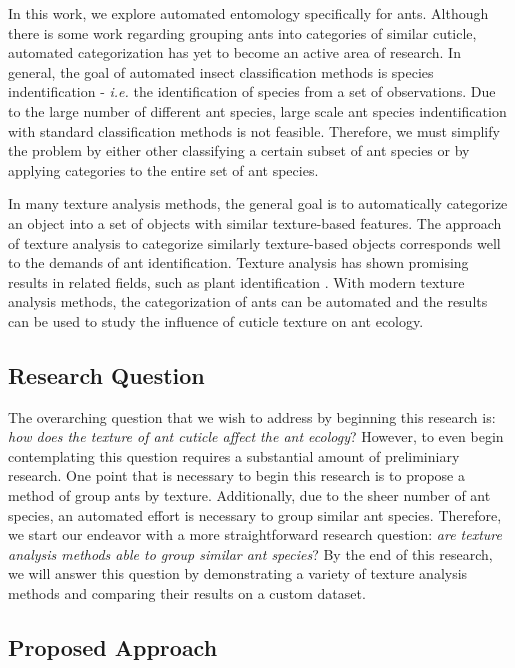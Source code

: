 \documentclass[12pt]{article}
\begin{document}
In this work, we explore automated entomology specifically for ants. Although
there is some work regarding grouping ants into categories of similar cuticle,
automated categorization has yet to become an active area of research. In
general, the goal of automated insect classification methods is species
indentification - \textit{i.e.} the identification of species from a set of
observations. Due to the large number of different ant species, large scale ant
species indentification with standard classification methods is not feasible.
Therefore, we must simplify the problem by either other classifying a certain
subset of ant species or by applying categories to the entire set of ant
species.

In many texture analysis methods, the general goal is to automatically
categorize an object into a set of objects with similar texture-based features.
The approach of texture analysis to categorize similarly texture-based objects
corresponds well to the demands of ant identification. Texture analysis has
shown promising results in related fields, such as plant identification
\cite{boudra_plant_2018}. With modern texture analysis methods, the
categorization of ants can be automated and the results can be used to study the
influence of cuticle texture on ant ecology.

\subsection{Research Question}

The overarching question that we wish to address by beginning this research is:
\textit{how does the texture of ant cuticle affect the ant ecology}? However, to
even begin contemplating this question requires a substantial amount of
preliminiary research. One point that is necessary to begin this research is to
propose a method of group ants by texture. Additionally, due to the sheer number
of ant species, an automated effort is necessary to group similar ant species.
Therefore, we start our endeavor with a more straightforward research question:
\textit{are texture analysis methods able to group similar ant species}? By the
end of this research, we will answer this question by demonstrating a variety of
texture analysis methods and comparing their results on a custom dataset.

\subsection{Proposed Approach}
\end{document}
